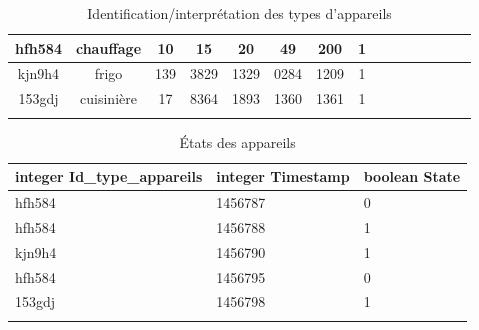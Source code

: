 \documentclass[10pt,a4paper]{article}
\begin{document}
\begin{table}[h]
{\begin{tabular}{|c|c|c|c|c|c|c|c|c|c|c|c|c|c|c|}
hfh584 & chauffage & 10 & 15 & 20 & 49 & 200 & 1 &  &  &  &  &  &  &  \\ \hline
kjn9h4 & frigo & 139 & 3829 & 1329 & 0284 & 1209 & 1 &  &  &  &  &  &  &  \\ \hline
153gdj & cuisinière & 17 & 8364 & 1893 & 1360 & 1361 & 1 &  &  &  &  &  &  &  \\ \hline
 &  &  &  &  &  &  &  &  &  &  &  &  &  & 
\end{tabular}
}
\caption{Identification/interprétation des types d'appareils}
\end{table}
\begin{table}[h!]
\centering
    \begin{tabular}{|l|l|l|}
    \hline
    \rowcolor[HTML]{EFEFEF} 
    integer Id\_type\_appareils & integer Timestamp & boolean State \\ \hline
    hfh584                               & 1456787           & 0             \\ \hline
    hfh584                               & 1456788           & 1             \\ \hline
    kjn9h4                               & 1456790           & 1             \\ \hline
    hfh584                               & 1456795           & 0             \\ \hline
    153gdj                               & 1456798           & 1             \\ \hline	 &                   &              
    \end{tabular}
    \caption{États des appareils}
\end{table}
\end{document}
